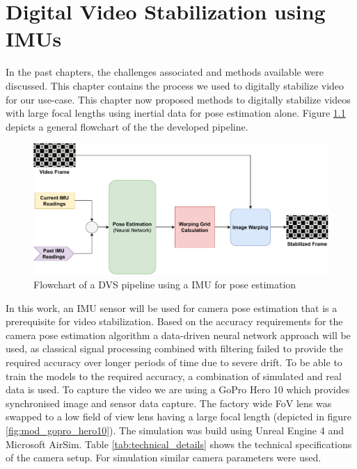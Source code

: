 \chapter{Digital Video Stabilization using IMUs} \label{chapter_four}

In the past chapters, the challenges associated and methods available were discussed. This chapter contains the process we used to digitally stabilize video for our use-case. This chapter now proposed methods to digitally stabilize videos with large focal lengths using inertial data for pose estimation alone. Figure \ref{fig:dis_pipeline} depicts a general flowchart of the the developed pipeline.


\begin{figure}[H]
    \includegraphics[scale=0.58]{images/fig_chapter4/dis_pipleline.pdf}
    \caption{Flowchart of a DVS pipeline using a IMU for pose estimation}
    \label{fig:dis_pipeline}
\end{figure}

In this work, an IMU sensor will be used for camera pose estimation that is a prerequisite for video stabilization. Based on the accuracy requirements for the camera pose estimation algorithm a data-driven neural network approach will be used, as classical signal processing combined with filtering failed to provide the required accuracy over longer periods of time due to severe drift. To be able to train the models to the required accuracy, a combination of simulated and real data is used. To capture the video we are using a GoPro Hero 10 which provides synchronised image and sensor data capture. The factory wide FoV lens was swapped to a low field of view lens having a large focal length (depicted in figure \ref{fig:mod_gopro_hero10}). The simulation was build using Unreal Engine 4 and Microsoft AirSim. Table \ref{tab:technical_details} shows the technical specifications of the camera setup. For simulation similar camera parameters were used.

